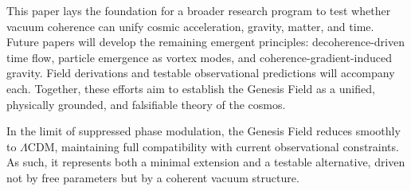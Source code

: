 This paper lays the foundation for a broader research program to test whether vacuum coherence can unify cosmic acceleration, gravity, matter, and time. Future papers will develop the remaining emergent principles: decoherence-driven time flow, particle emergence as vortex modes, and coherence-gradient-induced gravity. Field derivations and testable observational predictions will accompany each. Together, these efforts aim to establish the Genesis Field as a unified, physically grounded, and falsifiable theory of the cosmos.

In the limit of suppressed phase modulation, the Genesis Field reduces smoothly to $\Lambda$CDM, maintaining full compatibility with current observational constraints. As such, it represents both a minimal extension and a testable alternative, driven not by free parameters but by a coherent vacuum structure.
